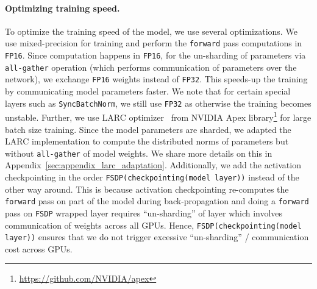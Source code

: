 \documentclass[10pt,twocolumn,letterpaper]{article}
\newcommand{\syncbn}{\texttt{SyncBatchNorm}\xspace}
\begin{document}
\paragraph{Optimizing training speed.}
To optimize the training speed of the model, we use several optimizations. We use mixed-precision for training and perform the \texttt{forward} pass computations in \texttt{FP16}. Since computation happens in \texttt{FP16}, for the un-sharding of parameters via \texttt{all-gather} operation (which performs communication of parameters over the network), we exchange \texttt{FP16} weights instead of \texttt{FP32}. This speeds-up the training by communicating model parameters faster. We note that for certain special layers such as \syncbn, we still use \texttt{FP32} as otherwise the training becomes unstable. Further, we use LARC optimizer~\cite{you2017large} from NVIDIA Apex library\footnote{\url{https://github.com/NVIDIA/apex}} for large batch size training. Since the model parameters are sharded, we adapted the LARC implementation to compute the distributed norms of parameters but without \texttt{all-gather} of model weights. We share more details on this in Appendix~\ref{sec:appendix_larc_adaptation}. Additionally, we add the activation checkpointing in the order \texttt{FSDP(checkpointing(model layer))} instead of the other way around. This is because activation checkpointing re-computes the \texttt{forward} pass on part of the model during back-propagation and doing a \texttt{forward} pass on \texttt{FSDP} wrapped layer requires ``un-sharding'' of layer which involves communication of weights across all GPUs. Hence, \texttt{FSDP(checkpointing(model layer))} ensures that we do not trigger excessive ``un-sharding'' / communication cost across GPUs. 
\end{document}
